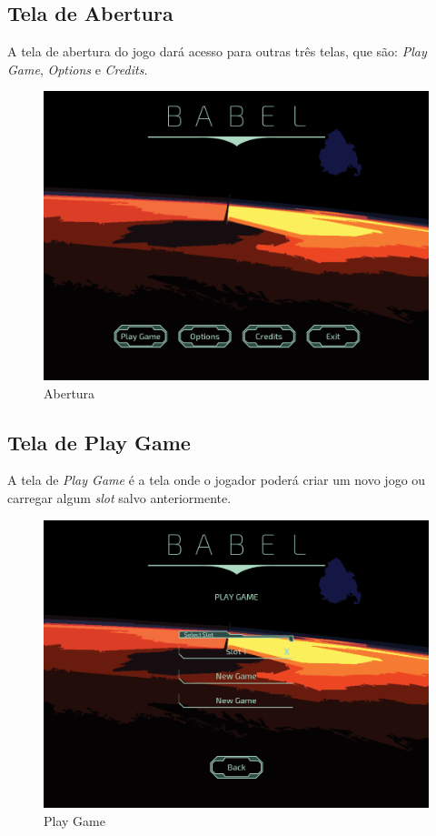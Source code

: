 \documentclass[11pt]{article} %
\begin{document}
\subsection{Tela de Abertura}

A tela de abertura do jogo dará acesso para outras três telas, que são: \textit{Play Game}, \textit{Options} e \textit{Credits}.

\begin{figure}[!htp]
\centering
\includegraphics[scale=0.25]{res/abertura.png}
\caption{Abertura}
\label{Abertura}
\end{figure}

\newpage

\subsection{Tela de Play Game}

A tela de \textit{Play Game} é a tela onde o jogador poderá criar um novo jogo ou carregar algum \textit{slot} salvo anteriormente.

\begin{figure}[!htp]
\centering
\includegraphics[scale=0.25]{res/load.png}
\caption{Play Game}
\label{Play Game}
\end{figure}
\end{document}
